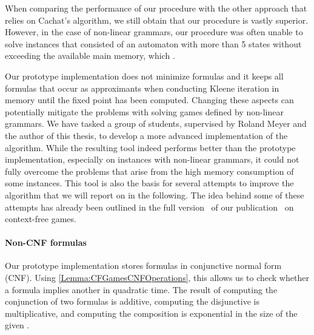 \documentclass[../../diss.tex]{subfiles}
\begin{document}
When comparing the performance of our procedure with the other approach that relies on Cachat's algorithm, we still obtain that our procedure is vastly superior.
However, in the case of non-linear grammars, our procedure was often unable to solve instances that consisted of an automaton with more than 5 states without exceeding the available main memory, which .

Our prototype implementation does not minimize formulas and it keeps all formulas that occur as approximants when conducting Kleene iteration in memory until the fixed point has been computed.
Changing these aspects can potentially mitigate the problems with solving games defined by non-linear grammars.
We have tasked a group of students, supervised by Roland Meyer and the author of this thesis, to develop a more advanced implementation of the algorithm.
While the resulting tool indeed performs better than the prototype implementation, especially on instances with non-linear grammars, it could not fully overcome the problems that arise from the high memory consumption of some instances.
This tool is also the basis for several attempts to improve the algorithm that we will report on in the following.
The idea behind some of these attempts has already been outlined in the full version~\cite{HolikMM16a} of our publication~\cite{HolikMM16} on context-free games.

\paragraph{Non-CNF formulas}

Our prototype implementation stores formulas in conjunctive normal form (CNF).
Using \cref{Lemma:CFGamesCNFOperations}, this allows us to check whether a formula implies another in quadratic time.
The result of computing the conjunction of two formulas is additive, computing the disjunctive is multiplicative, and computing the composition is exponential in the size of the given .
\end{document}
